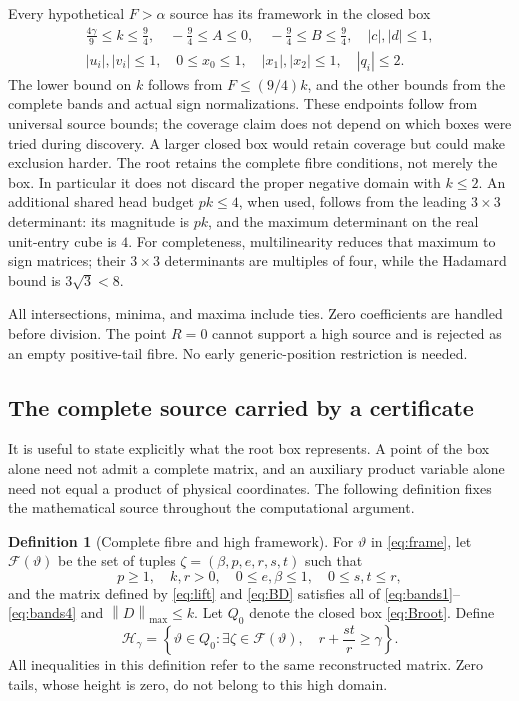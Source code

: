 \documentclass[11pt,reqno]{amsart}
\theoremstyle{definition}
\newtheorem{definition}[theorem]{Definition}
\theoremstyle{remark}
\newcommand{\mx}[1]{\left\|#1\right\|_{\max}}
\newcommand{\gam}{\gamma}
\begin{document}
Every hypothetical \(F>\alpha\) source has its framework in the closed
box
\begin{equation}\label{eq:Broot}
\begin{gathered}
\frac{4\gam}{9}\le k\le\frac94,\quad
-\frac94\le A\le0,\quad-\frac94\le B\le\frac94,\quad
|c|,|d|\le1,\\
|u_i|,|v_i|\le1,\quad0\le x_0\le1,\quad
|x_1|,|x_2|\le1,\quad |q_i|\le2.
\end{gathered}
\end{equation}
The lower bound on \(k\) follows from \(F\le(9/4)k\), and the other
bounds from the complete bands and actual sign normalizations.
These endpoints follow from universal source bounds; the coverage claim
does not depend on which boxes were tried during discovery. A larger
closed box would retain coverage but could make exclusion harder.
The root retains the complete fibre conditions, not merely the box.
In particular it does not discard the proper negative domain with
\(k\le2\). An additional shared head budget \(pk\le4\), when used,
follows from the leading \(3\times3\) determinant: its magnitude is
\(pk\), and the maximum determinant on the real unit-entry cube is
\(4\). For completeness, multilinearity reduces that maximum to
sign matrices; their \(3\times3\) determinants are multiples of
four, while the Hadamard bound is \(3\sqrt3<8\).

All intersections, minima, and maxima include ties.
Zero coefficients are handled before division. The point \(R=0\)
cannot support a high source and is rejected as an empty
positive-tail fibre. No early generic-position restriction is needed.

\subsection{The complete source carried by a certificate}\label{sec:source-interface}
It is useful to state explicitly what the root box represents. A point
of the box alone need not admit a complete matrix, and an auxiliary
product variable alone need not equal a product of physical coordinates.
The following definition fixes the mathematical source throughout the
computational argument.

\begin{definition}[Complete fibre and high framework]\label{def:complete-fibre}
For \(\vartheta\) in \eqref{eq:frame}, let
\(\mathcal F(\vartheta)\) be the set of tuples
\(\zeta=(\beta,p,e,r,s,t)\) such that
\[
p\ge1,\quad k,r>0,\quad 0\le e,\beta\le1,
\quad 0\le s,t\le r,
\]
and the matrix defined by \eqref{eq:lift} and \eqref{eq:BD} satisfies
all of \eqref{eq:bands1}--\eqref{eq:bands4} and \(\mx D\le k\).
Let \(Q_0\) denote the closed box \eqref{eq:Broot}. Define
\[
\mathcal H_\gamma=
\left\{\vartheta\in Q_0:
\exists\zeta\in\mathcal F(\vartheta),\quad
r+\frac{st}{r}\ge\gamma\right\}.
\]
All inequalities in this definition refer to the same reconstructed
matrix. Zero tails, whose height is zero, do not belong to this high domain.
\end{definition}
\end{document}
